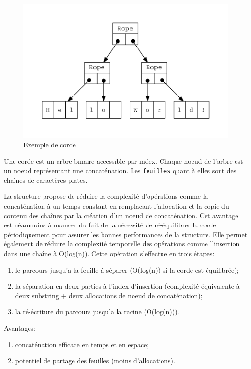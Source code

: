\begin{figure}
	\caption{Exemple de corde}
	\label{ropeexample}
	\centering
	\includegraphics{figures/rope.pdf}
\end{figure}

Une corde est un arbre binaire accessible par index.
Chaque noeud de l'arbre est un noeud représentant une concaténation.
Les \texttt{feuilles} quant à elles sont des chaînes de caractères plates.

La structure propose de réduire la complexité d'opérations comme la concaténation à un
temps constant en remplacant l'allocation et la copie du contenu des chaînes par
la création d'un noeud de concaténation.
Cet avantage est néanmoins à nuancer du fait de la nécessité de ré-équilibrer la corde
périodiquement pour assurer les bonnes performances de la structure.
Elle permet également de réduire la complexité temporelle des opérations comme
l'insertion dans une chaîne à O(log(n)).
Cette opération s'effectue en trois étapes:

\begin{enumerate}
	\item le parcours jusqu'a la feuille à séparer (O(log(n)) si la corde est équilibrée);
	\item la séparation en deux parties à l'index d'insertion (complexité équivalente à deux substring + deux allocations de noeud de concaténation);
	\item la ré-écriture du parcours jusqu'a la racine (O(log(n))).
\end{enumerate}

Avantages:
\begin{enumerate}
	\item concaténation efficace en temps et en espace;
	\item potentiel de partage des feuilles (moins d'allocations).
\end{enumerate}

